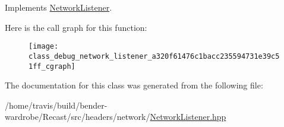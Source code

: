 Implements \hyperlink{class_network_listener_a721846b67227e7b3ac96c3d7d7065655}{Network\-Listener}.



Here is the call graph for this function\-:
\nopagebreak
\begin{figure}[H]
\begin{center}
\leavevmode
\texttt{[image: class\_debug\_network\_listener\_a320f61476c1bacc235594731e39c51ff\_cgraph]}
\end{center}
\end{figure}




The documentation for this class was generated from the following file\-:\begin{DoxyCompactItemize}
\item 
/home/travis/build/bender-\/wardrobe/\-Recast/src/headers/network/\hyperlink{_network_listener_8hpp}{Network\-Listener.\-hpp}\end{DoxyCompactItemize}
